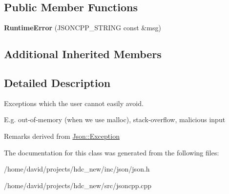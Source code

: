 \subsection*{Public Member Functions}
\begin{DoxyCompactItemize}
\item 
{\bfseries Runtime\+Error} (J\+S\+O\+N\+C\+P\+P\+\_\+\+S\+T\+R\+I\+NG const \&msg)\hypertarget{class_json_1_1_runtime_error_a0f6445dc345ce0a703610b6e893fee40}{}\label{class_json_1_1_runtime_error_a0f6445dc345ce0a703610b6e893fee40}

\end{DoxyCompactItemize}
\subsection*{Additional Inherited Members}


\subsection{Detailed Description}
Exceptions which the user cannot easily avoid.

E.\+g. out-\/of-\/memory (when we use malloc), stack-\/overflow, malicious input

\begin{DoxyRemark}{Remarks}
derived from \hyperlink{class_json_1_1_exception}{Json\+::\+Exception} 
\end{DoxyRemark}


The documentation for this class was generated from the following files\+:\begin{DoxyCompactItemize}
\item 
/home/david/projects/hdc\+\_\+new/inc/json/json.\+h\item 
/home/david/projects/hdc\+\_\+new/src/jsoncpp.\+cpp\end{DoxyCompactItemize}
